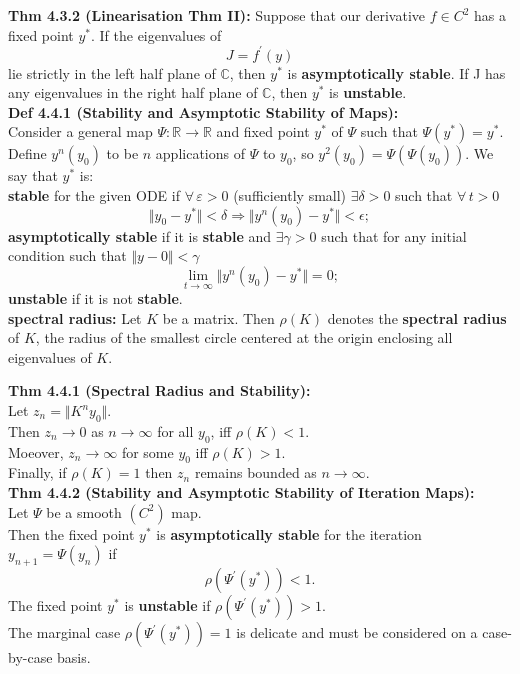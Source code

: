 \documentclass[10pt,a4paper]{article}
\newcommand{\R}{\mathbb{R}}
\newcommand{\C}{\mathbb{C}}
\renewcommand{\implies}{\Rightarrow}
\begin{document}
\begin{multicols*}{2}
\textbf{Thm 4.3.2 (Linearisation Thm II):} Suppose that our derivative $f \in C^2$ has a fixed point $y^*$. If the eigenvalues of 
\[
J = f^\prime(y)    
\]
lie strictly in the left half plane of $\C$, then $y^*$ is \textbf{asymptotically stable}. If J has any eigenvalues in the right half plane of $\C$, then $y^*$ is \textbf{unstable}.\\

\textbf{Def 4.4.1 (Stability and Asymptotic Stability of Maps):}\\
Consider a general map $\Psi : \R \to \R$ and fixed point $y^*$ of $\Psi$ such that $\Psi(y^*) = y^*$. Define $y^n(y_0)$ to be $n$ applications of $\Psi$ to $y_0$, so $y^2(y_0) = \Psi(\Psi(y_0))$. We say that $y^*$ is:\\
\textbf{stable} for the given ODE if $\forall \, \varepsilon > 0$ (sufficiently small) $\exists \delta > 0$ such that $\forall \, t > 0$
\[
    \Vert y_0 - y^*\Vert  < \delta \implies \Vert y^n(y_0) - y^* \Vert < \epsilon;
\]
\textbf{asymptotically stable} if it is \textbf{stable} and $\exists \gamma > 0 $ such that for any initial condition such that $\Vert y-0 \Vert < \gamma$ 
\[
    \lim_{t \to \infty} \Vert y^n(y_0) - y^* \Vert = 0;
\]
\textbf{unstable} if it is not \textbf{stable}.\\

\textbf{spectral radius:} Let $K$ be a matrix. Then $\rho(K)$ denotes the \textbf{spectral radius} of $K$, the radius of the smallest circle centered at the origin enclosing all eigenvalues of $K$.

\textbf{Thm 4.4.1 (Spectral Radius and Stability):}\\
Let $z_n = \Vert K^ny_0 \Vert$.\\
Then $z_n \to 0$ as $n \to \infty$ for all $y_0$, iff $\rho(K) < 1$.\\
Moeover, $z_n \to \infty$ for some $y_0$ iff $\rho(K) > 1$.\\
Finally, if $\rho(K) = 1$ then $z_n$ remains bounded as $n \to \infty$.\\

\textbf{Thm 4.4.2 (Stability and Asymptotic Stability of Iteration Maps):} \\
Let $\Psi$ be a smooth $(C^2)$ map.\\
Then the fixed point $y^*$ is \textbf{asymptotically stable} for the iteration $y_{n+1} = \Psi(y_n)$ if 
\[
    \rho(\Psi^\prime(y^*)) < 1.
\] 
The fixed point $y^*$ is \textbf{unstable} if $\rho(\Psi^\prime(y^*)) > 1$.\\
The marginal case $\rho(\Psi^\prime(y^*)) = 1$ is delicate and must be considered on a case-by-case basis.\\


\end{multicols*}
\end{document}
